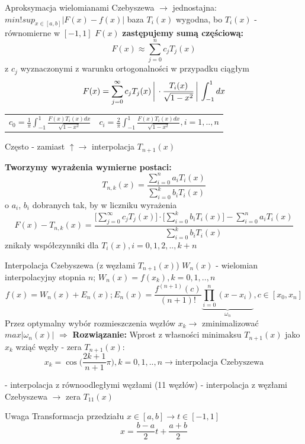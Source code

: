 \begin{frame}{Aproksymacja wielomianami Czebyszewa}
	$\rightarrow$ jednostajna: $min!sup_{x \in [a,b]}|F(x)-f(x)|$ \newline
    baza $T_i(x)$ wygodna, bo $T_i(x)$ - równomierne w $[-1,1]$ \newline
    $F(x)$ \textbf{zastępujemy sumą częściową:}
    $$F(x) \approx \sum_{j=0}^{n}c_jT_j(x)$$
    z $c_j$ wyznaczonymi z warunku ortogonalności w przypadku ciągłym
    $$F(x) = \sum_{j=0}^{\infty}c_jT_j(x)    \bigg\arrowvert \cdot\frac{T_i(x)}{\sqrt{1-x^2}}  \bigg\arrowvert \int_{-1}^{1}dx$$
    \begin{tabular}{ll}
    $c_0 = \frac{1}{\pi}\int_{-1}^{1}\frac{F(x)T_i(x)dx}{\sqrt{1-x^2}}$ &
    $c_i = \frac{2}{\pi}\int_{-1}^{1}\frac{F(x)T_i(x)dx}{\sqrt{1-x^2}}, i=1,..,n$
    \end{tabular}
    
    Często - zamiast $\uparrow \rightarrow$ interpolacja $T_{n+1}(x)$
\end{frame}
\begin{frame}
	\textbf{Tworzymy wyrażenia wymierne postaci:}
    $$T_{n,k}(x) = \frac{\sum_{i=0}^{n}a_iT_i(x)}{\sum_{i=0}^{k}b_iT_i(x)}$$
    o $a_i$, $b_i$ dobranych tak, by w liczniku wyrażenia 
    $$F(x)-T_{n,k}(x) = \frac{\big[\sum_{j=0}^{\infty}c_jT_j(x)\big] \cdot \big[\sum_{i=0}^{k}b_iT_i(x)\big] - \sum_{i=0}^{n}a_iT_i(x)}{\sum_{i=0}^{k}b_iT_i(x)}$$
    znikały współczynniki dla $T_i(x),i=0,1,2,..,k+n$
\end{frame}
\begin{frame}{Interpolacja Czebyszewa (z węzłami $T_{n+1}(x)$)}
	$W_n(x)$ - wielomian interpolacyjny stopnia $n$; $W_n(x) = f(x_k),k=0,1,..,n$
    $$f(x) = W_n(x)+E_n(x); E_n(x) = \frac{f^{(n+1)}(c)}{(n+1)!}\underbrace{\prod_{i=0}^{n}(x-x_i)}_{\omega_n}
	, c \in [x_0,x_n]$$
    Przez optymalny wybór rozmieszczenia węzłów $x_k \rightarrow$ zminimalizować $max|\omega_n(x)|$\newline
    $\Rightarrow$ \textbf{Rozwiązanie:} Wprost z własności minimaksu $T_{n+1}(x)$ jako $x_k$ wziąć węzły - zera $T_{n+1}(x)$:
    $$x_k = \cos \Big(\frac{2k+1}{n+1}\pi\Big), k=0,1,..,n \rightarrow \text{interpolacja Czebyszewa}$$
    
\end{frame}
\begin{frame}
	- interpolacja z równoodległymi węzłami (11 węzłów)\newline
    - interpolacja z węzłami Czebyszewa $\rightarrow$ zera $T_{11}(x)$
    \begin{block}{Uwaga}
    Transformacja przedziału $x \in [a,b] \rightarrow t \in [-1,1]$
    $$x=\frac{b-a}{2}t+\frac{a+b}{2}$$
    \end{block}
\end{frame}
